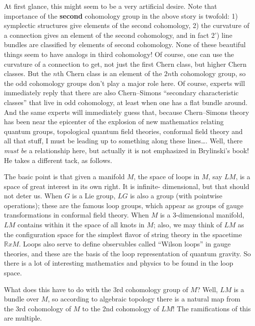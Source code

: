 \documentclass[12pt]{article}
\begin{document}
At first glance, this might seem to be a very artificial desire. Note
that importance of the \textbf{second} cohomology group in the above
story is twofold: 1) symplectic structures give elements of the second
cohomology, 2) the curvature of a connection gives an element of the
second cohomology, and in fact 2') line bundles are classified by
elements of second cohomology. None of these beautiful things seem to
have analogs in third cohomology! Of course, one can use the curvature
of a connection to get, not just the first Chern class, but higher Chern
classes. But the \(n\)th Chern class is an element of the \(2n\)th
cohomology group, so the odd cohomology groups don't play a major role
here. Of course, experts will immediately reply that there are also
Chern--Simons ``secondary characteristic classes'' that live in odd
cohomology, at least when one has a flat bundle around. And the same
experts will immediately guess that, because Chern--Simons theory has
been near the epicenter of the explosion of new mathematics relating
quantum groups, topological quantum field theories, conformal field
theory and all that stuff, I must be leading up to something along these
lines\ldots. Well, there \emph{must be} a relationship here, but
actually it is not emphasized in Brylinski's book! He takes a different
tack, as follows.

The basic point is that given a manifold \(M\), the space of loops in
\(M\), say \(LM\), is a space of great interest in its own right. It is
infinite- dimensional, but that should not deter us. When \(G\) is a Lie
group, \(LG\) is also a group (with pointwise operations); these are the
famous loop groups, which appear as groups of gauge transformations in
conformal field theory. When \(M\) is a \(3\)-dimensional manifold,
\(LM\) contains within it the space of all knots in \(M\); also, we may
think of \(LM\) as the configuration space for the simplest flavor of
string theory in the spacetime \(\mathbb{R} x M\). Loops also serve to
define observables called ``Wilson loops'' in gauge theories, and these
are the basis of the loop representation of quantum gravity. So there is
a lot of interesting mathematics and physics to be found in the loop
space.

What does this have to do with the 3rd cohomology group of \(M\)? Well,
\(LM\) is a bundle over \(M\), so according to algebraic topology there
is a natural map from the 3rd cohomology of \(M\) to the 2nd cohomology
of \(LM\)! The ramifications of this are multiple.
\end{document}
